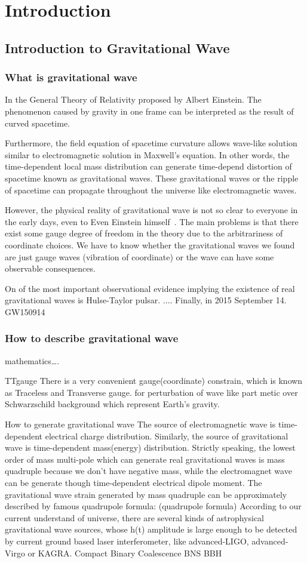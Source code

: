 \chapter{Introduction} 
\section{Introduction to Gravitational Wave}
\subsection{What is gravitational wave}
In the General Theory of Relativity proposed by Albert Einstein. The phenomenon caused by gravity in one frame can be interpreted as the result of curved spacetime.


Furthermore, the field equation of spacetime curvature allows wave-like solution similar to electromagnetic solution in Maxwell’s equation. In other words, the time-dependent local mass distribution can generate time-depend distortion of spacetime known as gravitational waves. These gravitational waves or the ripple of spacetime can propagate throughout the universe like electromagnetic waves.
	
However, the physical reality of gravitational wave is not so clear to everyone in the early days, even to Even Einstein himself~\cite{?}. The main problems is that there exist some gauge degree of freedom in the theory due to the arbitrariness of coordinate choices. We have to know whether the gravitational waves we found are just gauge waves (vibration of coordinate) or the wave can have some observable consequences. 

On of the most important observational evidence implying the existence of real gravitational waves is Hulse-Taylor pulsar.  
....
Finally, in 2015 September 14.
GW150914

\subsection{How to describe gravitational wave}
mathematics….

TTgauge
There is a very convenient gauge(coordinate) constrain, which is known as Traceless and Transverse gauge. 
for perturbation of wave like part metic over Schwarzschild background which represent Earth’s gravity.

How to generate gravitational wave
The source of electromagnetic wave is time-dependent electrical charge distribution.  Similarly, the source of gravitational wave is time-dependent mass(energy) distribution. Strictly speaking, the lowest order of mass multi-pole which can generate real gravitational waves is mass quadruple because we don’t have negative mass, while the electromagnet wave can be generate though time-dependent electrical dipole moment. The gravitational wave strain generated by mass quadruple can be approximately described by famous quadrupole formula:
(quadrupole formula)
According to our current understand of universe, there are several kinds of astrophysical gravitational wave sources, whose h(t) amplitude is large enough to be detected by current ground based laser interferometer, like advanced-LIGO, advanced-Virgo or KAGRA.
Compact Binary Coalescence 
BNS BBH
